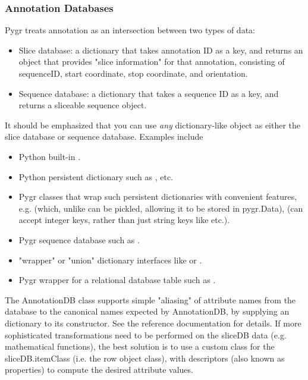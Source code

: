 \documentclass{howto}
\begin{document}
\subsubsection{Annotation Databases}
Pygr treats annotation as an intersection between two types of data:
\begin{itemize}
\item Slice database: a dictionary that takes annotation ID as a key,
and returns an object that provides "slice information" for that annotation,
consisting of sequenceID, start coordinate, stop coordinate, and orientation.

\item Sequence database: a dictionary that takes a sequence ID as a key,
and returns a sliceable sequence object.
\end{itemize}

It should be emphasized that you can use {\em any} dictionary-like object
as either the slice database or sequence database.  Examples include
\begin{itemize}
\item Python built-in .

\item Python persistent dictionary such as ,  etc.

\item Pygr classes that wrap such persistent dictionaries with convenient
features, e.g.  (which, unlike  can be
pickled, allowing it to be stored in pygr.Data),  (can accept
integer keys, rather than just string keys like  etc.).

\item Pygr sequence database such as .

\item "wrapper" or "union" dictionary interfaces like 
or .

\item Pygr wrapper for a relational database table such as .
\end{itemize}

The AnnotationDB class supports
simple "aliasing" of attribute names from the database to the canonical
names expected by AnnotationDB, by supplying an  dictionary
to its constructor.  See the  reference documentation for
details.  If more sophisticated transformations need to be performed
on the sliceDB data (e.g. mathematical functions), the best solution is to
use a custom class for the sliceDB.itemClass (i.e. the row object class), 
with descriptors (also known as properties) to compute the desired attribute
values.
\end{document}
